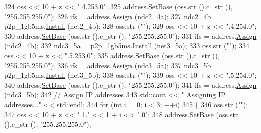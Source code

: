 \begin{DoxyCode}
324       oss << 10 + z << \textcolor{stringliteral}{".4.253.0"};
325       address.\hyperlink{classns3_1_1Ipv4AddressHelper_acf7b16dd25bac67e00f5e25f90a9a035}{SetBase} (oss.str ().c\_str (), \textcolor{stringliteral}{"255.255.255.0"});
326       ifs = address.\hyperlink{classns3_1_1Ipv4AddressHelper_af8e7f4a1a7e74c00014a1eac445a27af}{Assign} (ndc2\_4a);
327       ndc2\_4b = p2p\_1gb5ms.\hyperlink{classns3_1_1PointToPointHelper_ab9162fea3e88722666fed1106df1f9ec}{Install} (net2\_4b);
328       oss.str (\textcolor{stringliteral}{""});
329       oss << 10 + z << \textcolor{stringliteral}{".4.254.0"};
330       address.\hyperlink{classns3_1_1Ipv4AddressHelper_acf7b16dd25bac67e00f5e25f90a9a035}{SetBase} (oss.str ().c\_str (), \textcolor{stringliteral}{"255.255.255.0"});
331       ifs = address.\hyperlink{classns3_1_1Ipv4AddressHelper_af8e7f4a1a7e74c00014a1eac445a27af}{Assign} (ndc2\_4b);
332       ndc3\_5a = p2p\_1gb5ms.\hyperlink{classns3_1_1PointToPointHelper_ab9162fea3e88722666fed1106df1f9ec}{Install} (net3\_5a);
333       oss.str (\textcolor{stringliteral}{""});
334       oss << 10 + z << \textcolor{stringliteral}{".5.253.0"};
335       address.\hyperlink{classns3_1_1Ipv4AddressHelper_acf7b16dd25bac67e00f5e25f90a9a035}{SetBase} (oss.str ().c\_str (), \textcolor{stringliteral}{"255.255.255.0"});
336       ifs = address.\hyperlink{classns3_1_1Ipv4AddressHelper_af8e7f4a1a7e74c00014a1eac445a27af}{Assign} (ndc3\_5a);
337       ndc3\_5b = p2p\_1gb5ms.\hyperlink{classns3_1_1PointToPointHelper_ab9162fea3e88722666fed1106df1f9ec}{Install} (net3\_5b);
338       oss.str (\textcolor{stringliteral}{""});
339       oss << 10 + z << \textcolor{stringliteral}{".5.254.0"};
340       address.\hyperlink{classns3_1_1Ipv4AddressHelper_acf7b16dd25bac67e00f5e25f90a9a035}{SetBase} (oss.str ().c\_str (), \textcolor{stringliteral}{"255.255.255.0"});
341       ifs = address.\hyperlink{classns3_1_1Ipv4AddressHelper_af8e7f4a1a7e74c00014a1eac445a27af}{Assign} (ndc3\_5b);
342       \textcolor{comment}{// Assign IP addresses}
343       std::cout << \textcolor{stringliteral}{"  Assigning IP addresses..."} << std::endl;
344       \textcolor{keywordflow}{for} (\textcolor{keywordtype}{int} i = 0; i < 3; ++\hyperlink{bernuolliDistribution_8m_a6f6ccfcf58b31cb6412107d9d5281426}{i})
345         \{
346           oss.str (\textcolor{stringliteral}{""});
347           oss << 10 + z << \textcolor{stringliteral}{".1."} << 1 + i << \textcolor{stringliteral}{".0"};
348           address.\hyperlink{classns3_1_1Ipv4AddressHelper_acf7b16dd25bac67e00f5e25f90a9a035}{SetBase} (oss.str ().c\_str (), \textcolor{stringliteral}{"255.255.255.0"});

\end{DoxyCode}
